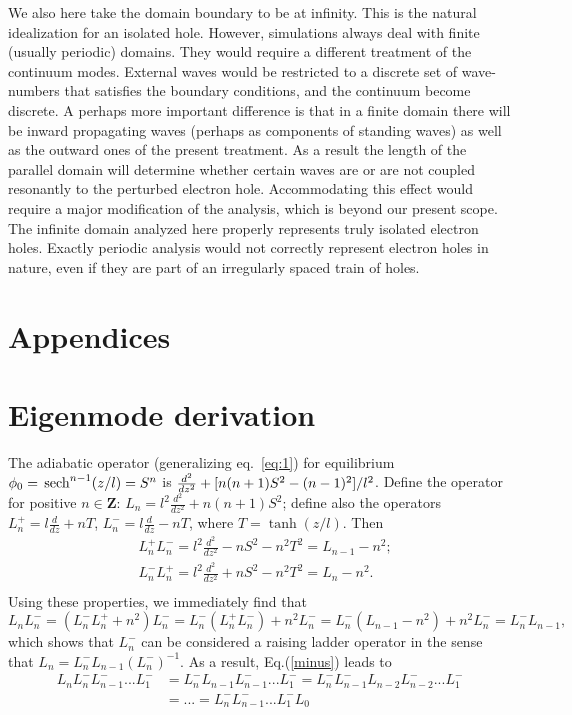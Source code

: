 \documentclass[12pt]{article}
\def\sech{{\,\rm sech}}
\begin{document}
We also here take the domain boundary to be at infinity. This is the
natural idealization for an isolated hole. However, simulations always
deal with finite (usually periodic) domains. They would require a
different treatment of the continuum modes. External waves would be
restricted to a discrete set of wave-numbers that satisfies the
boundary conditions, and the continuum become discrete. A perhaps more
important difference is that in a finite domain there will be inward
propagating waves (perhaps as components of standing waves) as well as
the outward ones of the present treatment. As a result the length of
the parallel domain will determine whether certain waves are or are
not coupled resonantly to the perturbed electron hole. Accommodating
this effect would require a major modification of the analysis, which
is beyond our present scope. The infinite domain analyzed here properly
represents truly isolated electron holes. Exactly periodic analysis
would not correctly represent electron holes in nature, even if they
are part of an irregularly spaced train of holes.

\section*{Appendices}
\appendix
\section{Eigenmode derivation}

The adiabatic operator (generalizing eq.\ \ref{eq:1}) for equilibrium
$\phi_0=\sech^{n-1}(z/l)=S^n$ is
${d^2\over dz^2}+[n(n+1)S^2-(n-1)^2]/l^2$. Define the operator
for positive $n\in \mathbf{Z}$:
$L_n=l^2\frac{d^2}{dz^2}+{n(n+1)} S^2$; define also the operators
$L^+_n=l\frac{d}{dz}+n T$, $L^-_n=l\frac{d}{dz}-n T$, where
$T=\tanh(z/l)$. Then
\begin{equation}
\begin{split}
  &L^+_n L^-_n=l^2\frac{d^2}{dz^2}-n S^2-n^2 T^2
  =L_{n-1}-n^2;\\
  &L^-_n L^+_n=l^2\frac{d^2}{dz^2}+n S^2-n^2 T^2
  =L_n-n^2.\\
\end{split}
\end{equation}
Using these properties, we immediately find that
   \begin{equation}
     L_n L^-_n=(L^-_n L^+_n+n^2)L^-_n=L^-_n (L^+_n
     L^-_n)+n^2L^-_n=L^-_n (L_{n-1}-n^2)+n^2 L^-_n=L^-_n L_{n-1},
     \label{minus}
   \end{equation}
which shows that $L^-_n$ can be considered a raising ladder operator
in the sense that $L_n=L^-_nL_{n-1}(L^-_n)^{-1}$.   
As a result, Eq.(\ref{minus}) leads to
\begin{equation}
  \begin{split}
  L_n L_n ^- L_{n-1}^- ... L_1^-&=L^-_n L_{n-1}L_{n-1}^-
  ... L_1^-=L^-_n L_{n-1}^- L_{n-2}L_{n-2}^- ... L_1^-\\
  & = ...= L_n ^-L_{n-1}^- ... L_1^- L_0
  \end{split}
  \label{nu}
\end{equation}
\end{document}
